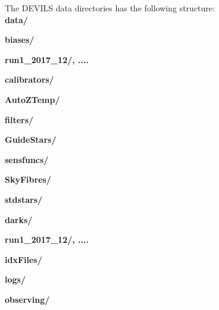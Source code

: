 \documentclass[12pt]{article}
\begin{document}
The DEVILS data directories has the following structure:\\

\hspace{5mm} \textbf{data/} 
\vspace{1mm}

\hspace{10mm} \textbf{biases/}
\vspace{1mm}

\hspace{15mm} \textbf{run1\_2017\_12/, ....} 
\vspace{1mm}

\hspace{10mm} \textbf{calibrators/} 
\vspace{1mm}

\hspace{15mm} \textbf{AutoZTemp/} 
\vspace{1mm}

\hspace{15mm} \textbf{filters/} 
\vspace{1mm}

\hspace{15mm} \textbf{GuideStars/}
\vspace{1mm}

\hspace{15mm} \textbf{sensfuncs/}
\vspace{1mm}

\hspace{15mm} \textbf{SkyFibres/}
\vspace{1mm}

\hspace{15mm} \textbf{stdstars/}
\vspace{1mm}

\hspace{10mm} \textbf{darks/} 
\vspace{1mm}

\hspace{15mm} \textbf{run1\_2017\_12/, ....}
\vspace{1mm}

\hspace{10mm} \textbf{idxFiles/} 
\vspace{1mm}

\hspace{10mm} \textbf{logs/} 
\vspace{1mm}

\hspace{10mm} \textbf{observing/} 
\vspace{1mm}
\end{document}

